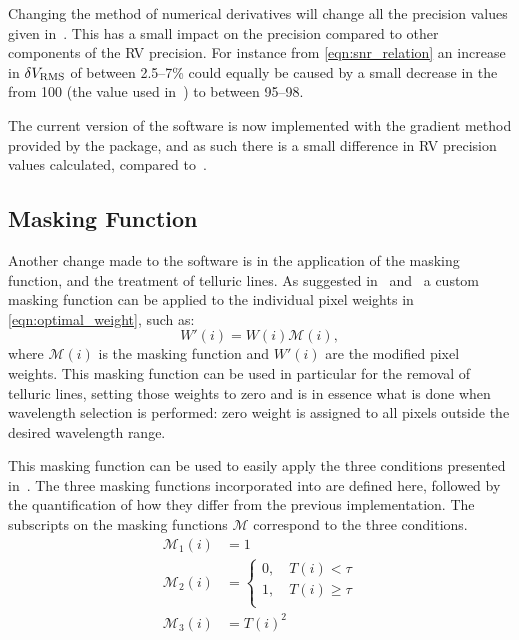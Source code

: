 Changing the method of numerical derivatives will change all the precision values given in~\citet{figueira_radial_2016}.
This has a small impact on the precision compared to other components of the {RV} precision.
For instance from \cref{eqn:snr_relation} an increase in \(\delta V_{\textrm{RMS}}\) of between 2.5--7\% could equally be caused by a small decrease in the \snr{} from 100 (the value used in~\citet{figueira_radial_2016}) to between 95--98.

The current version of the software is now implemented with the gradient method provided by the \numpy{} package, and as such there is a small difference in {RV} precision values calculated, compared to~\citet{figueira_radial_2016}.

\subsection{Masking Function}
\label{subsec:masking_function}
Another change made to the software is in the application of the masking function, and the treatment of telluric lines.
As suggested in~\citet{connes_absolute_1985} and~\citet{bouchy_fundamental_2001} a custom masking function can be applied to the individual pixel weights in \cref{eqn:optimal_weight}, such as:
\begin{equation}
W'(i) = W(i)\mathcal{M}(i),\label{eqn:mask_function}
\end{equation}
where \(\mathcal{M}(i)\) is the masking function and \(W'(i)\) are the modified pixel weights.
This masking function can be used in particular for the removal of telluric lines, setting those weights to zero and is in essence what is done when wavelength selection is performed: zero weight is assigned to all pixels outside the desired wavelength range.

This masking function can be used to easily apply the three conditions presented in~\citet{figueira_radial_2016}.
The three masking functions incorporated into \eniric{} are defined here, followed by the quantification of how they differ from the previous implementation.
The subscripts on the masking functions \(\mathcal{M}\) correspond to the three conditions.
\begin{align}
{\mathcal{M}}_{1}(i) &= 1 \label{eqn:mask1}\\
{\mathcal{M}}_{2}(i) &= \begin{cases}
0, \hspace{1em} T(i) < \tau\\
1, \hspace{1em} T(i) \ge \tau\\
\end{cases}\label{eqn:mask2}\\
{\mathcal{M}}_{3}(i) &= {T(i)}^{2} \label{eqn:mask3}
\end{align}

